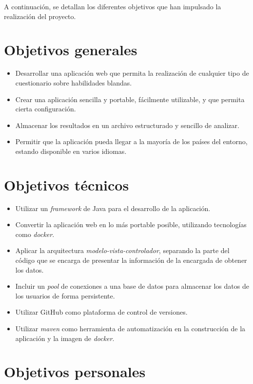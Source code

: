 
A continuación, se detallan los diferentes objetivos que han impulsado la realización del proyecto.

\section{Objetivos generales}

\begin{itemize}
	\item Desarrollar una aplicación web que permita la realización de cualquier tipo de cuestionario sobre habilidades blandas.
	\item Crear una aplicación sencilla y portable, fácilmente utilizable, y que permita cierta configuración.
	\item Almacenar los resultados en un archivo estructurado y sencillo de analizar.
	\item Permitir que la aplicación pueda llegar a la mayoría de los países del entorno, estando disponible en varios idiomas.
\end{itemize}


\section{Objetivos técnicos}


\begin{itemize}
	\item Utilizar un \textit{framework} de Java para el desarrollo de la aplicación.
	\item Convertir la aplicación web en lo más portable posible, utilizando tecnologías como \textit{docker}.
	\item Aplicar la arquitectura \textit{modelo-vista-controlador}, separando la parte del código que se encarga de presentar la información de la encargada de obtener los datos.
	\item Incluir un \textit{pool} de conexiones a una base de datos para almacenar los datos de los usuarios de forma persistente.
	\item Utilizar GitHub como plataforma de control de versiones.
	\item Utilizar \textit{maven} como herramienta de automatización en la construcción de la aplicación y la imagen de \textit{docker}.
\end{itemize}

\section{Objetivos personales}


